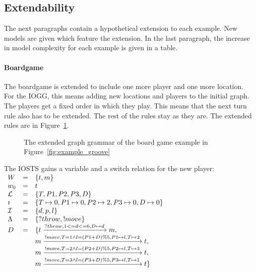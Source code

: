 \subsection{Extendability}
The next paragraphs contain a hypothetical extension to each example. New models are given which feature the extension. In the last paragraph, the increase in model complexity for each example is given in a table.

\paragraph*{Boardgame}
The boardgame is extended to include one more player and one more location. For the IOGG, this means adding new locations and players to the initial graph. The players get a fixed order in which they play. This means that the next turn rule also has to be extended. The rest of the rules stay as they are. The extended rules are in Figure~\ref{fig:gg-bg-extended}.

\begin{figure}[ht]
  \begin{center}
    \hspace{20px}
  \end{center}
  \caption{The extended graph grammar of the board game example in Figure~\ref{fig:example_groove}}
  \label{fig:gg-bg-extended}
\end{figure}

The IOSTS gains a variable and a switch relation for the new player:
\vspace{5px} \\
$\begin{array}{lcl}
W & = & \{t, m\} \\
w_0 & = & t \\
\mathcal{L} & = & \{T, P1, P2, P3, D\} \\
\imath & = & \{T \mapsto 0, P1 \mapsto 0, P2 \mapsto 2, P3 \mapsto 0, D \mapsto 0\} \\
\mathcal{I} & = & \{d, p, l\} \\
\Lambda & = & \{?throw, !move\} \\
D & = & \{t\xrightarrow{?throw, 1 <= d <= 6, D \mapsto d}m, \\
 & & m\xrightarrow{!move, T=1 \land l=(P1+D)\%5, P1 \mapsto l, T \mapsto 2}t, \\
 & & m\xrightarrow{!move, T=2 \land l=(P2+D)\%5, P2 \mapsto l, T \mapsto 3}t, \\
 & & m\xrightarrow{!move, T=3 \land l=(P3+D)\%5, P3 \mapsto l, T \mapsto 1}t\}
\end{array}$


